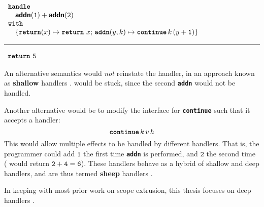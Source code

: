 \begin{enumerate}
         \begin{minipage}[t]{\linewidth}
          \centering
         \begin{efflst}
          $\begin{array}{l}
            \textbf{\texttt{handle}} \\
            \quad \textbf{\textsf{addn}}(\texttt{1}) + \textbf{\textsf{addn}}(\texttt{2}) \\
            \textbf{\texttt{with}} \\
            \quad \{ \textbf{\texttt{return}}(x) \mapsto {\texttt{\textbf{return}} \,\, {x}}; \, \textbf{\texttt{addn}}(y, k) \mapsto \textbf{\texttt{continue}} \, {k} \, {(y+\texttt{1})} \}\\
          \end{array}$
          \vspace{2mm} 
          \textcolor{effComment}{\hrule height 0.2mm \relax}
          \vspace{2mm} 
          
          \textcolor{effComment}{$\begin{array}{l}\texttt{\textbf{return}} \,\, {\texttt{5}}\end{array}$}
        \end{efflst}
        \centering
        \label{listing:eff-handler-type}
      \end{minipage}
      \par\vspace{0.6\baselineskip}
        An alternative semantics would \textit{not} reinstate the handler, in an approach known as \textbf{shallow} handlers \citep{hillestrom-2018}.  would be stuck, since the second \textbf{\texttt{addn}} would not be handled.

        Another alternative would be to modify the interface for \textbf{\texttt{continue}} such that it accepts a handler:
        \[\textbf{\texttt{continue}} \, k \,  v \, h\]
        This would allow multiple effects to be handled by different handlers. That is, the programmer could add $\texttt{1}$ the first time \textbf{\texttt{addn}} is performed, and $\texttt{2}$ the second time ( would return $\texttt{2}+\texttt{4}=\texttt{6}$). These handlers behave as a hybrid of shallow and deep handlers, and are thus termed \textbf{sheep} handlers \citep{phipps-costin-2023}. 
         
        In keeping with most prior work on scope extrusion, this thesis focuses on deep handlers \citep{isoda-24}. 


\end{enumerate}
